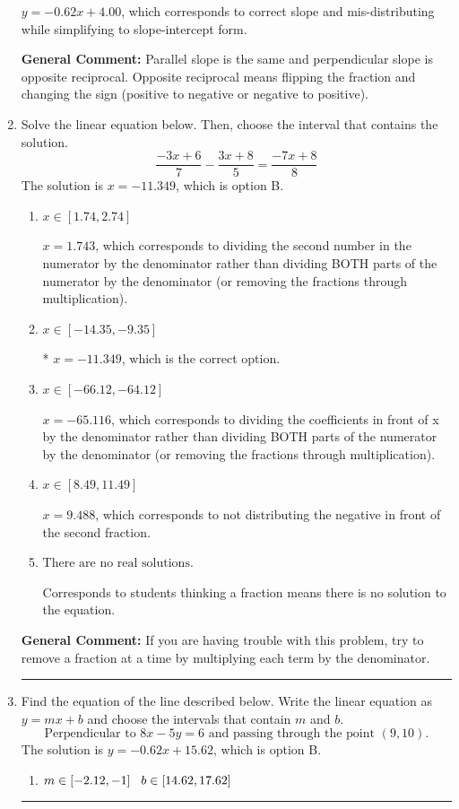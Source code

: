 \documentclass{extbook}[14pt]
\newcommand{\litem}[1]{\item #1

\rule{\textwidth}{0.4pt}}
\begin{document}
\begin{enumerate}
{\begin{enumerate}[label=\Alph*.]
 $y = -0.62x + 4.00$, which corresponds to correct slope and mis-distributing while simplifying to slope-intercept form.
\end{enumerate}

\textbf{General Comment:} Parallel slope is the same and perpendicular slope is opposite reciprocal. Opposite reciprocal means flipping the fraction and changing the sign (positive to negative or negative to positive).
}
\litem{
Solve the linear equation below. Then, choose the interval that contains the solution.
\[ \frac{-3x + 6}{7} - \frac{3x + 8}{5} = \frac{-7x + 8}{8} \]The solution is \( x = -11.349 \), which is option B.\begin{enumerate}[label=\Alph*.]
\item \( x \in [1.74, 2.74] \)

 $x = 1.743$, which corresponds to dividing the second number in the numerator by the denominator rather than dividing BOTH parts of the numerator by the denominator (or removing the fractions through multiplication).
\item \( x \in [-14.35, -9.35] \)

* $x = -11.349$, which is the correct option.
\item \( x \in [-66.12, -64.12] \)

 $x = -65.116$, which corresponds to dividing the coefficients in front of x by the denominator rather than dividing BOTH parts of the numerator by the denominator (or removing the fractions through multiplication).
\item \( x \in [8.49, 11.49] \)

 $x = 9.488$, which corresponds to not distributing the negative in front of the second fraction.
\item \( \text{There are no real solutions.} \)

Corresponds to students thinking a fraction means there is no solution to the equation.
\end{enumerate}

\textbf{General Comment:} If you are having trouble with this problem, try to remove a fraction at a time by multiplying each term by the denominator.
}
\litem{
Find the equation of the line described below. Write the linear equation as $ y=mx+b $ and choose the intervals that contain $m$ and $b$.
\[ \text{Perpendicular to } 8 x - 5 y = 6 \text{ and passing through the point } (9, 10). \]The solution is \( y = -0.62x + 15.62 \), which is option B.\begin{enumerate}[label=\Alph*.]
\item \( m \in [-2.12, -1] \hspace*{3mm} b \in [14.62, 17.62] \)


\end{enumerate}}
\end{enumerate}
\end{document}
